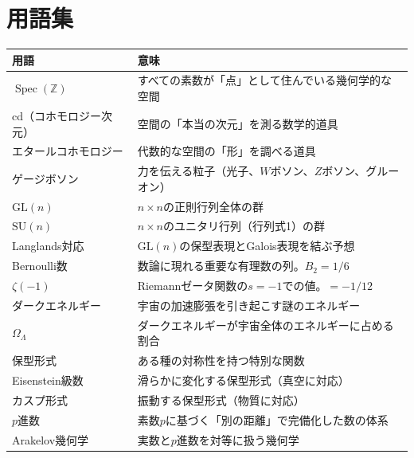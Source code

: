 \documentclass[12pt,a4paper]{article}
\newcommand{\Spec}{\operatorname{Spec}}
\begin{document}
\section*{用語集}

\begin{center}
\begin{tabular}{lp{10cm}}
\toprule
用語 & 意味 \\
\midrule
$\Spec(\mathbb{Z})$ & すべての素数が「点」として住んでいる幾何学的な空間 \\
cd（コホモロジー次元） & 空間の「本当の次元」を測る数学的道具 \\
エタールコホモロジー & 代数的な空間の「形」を調べる道具 \\
ゲージボソン & 力を伝える粒子（光子、$W$ボソン、$Z$ボソン、グルーオン） \\
$\mathrm{GL}(n)$ & $n\times n$の正則行列全体の群 \\
$\mathrm{SU}(n)$ & $n\times n$のユニタリ行列（行列式1）の群 \\
Langlands対応 & $\mathrm{GL}(n)$の保型表現とGalois表現を結ぶ予想 \\
Bernoulli数 & 数論に現れる重要な有理数の列。$B_2 = 1/6$ \\
$\zeta(-1)$ & Riemannゼータ関数の$s=-1$での値。$= -1/12$ \\
ダークエネルギー & 宇宙の加速膨張を引き起こす謎のエネルギー \\
$\Omega_\Lambda$ & ダークエネルギーが宇宙全体のエネルギーに占める割合 \\
保型形式 & ある種の対称性を持つ特別な関数 \\
Eisenstein級数 & 滑らかに変化する保型形式（真空に対応） \\
カスプ形式 & 振動する保型形式（物質に対応） \\
$p$進数 & 素数$p$に基づく「別の距離」で完備化した数の体系 \\
Arakelov幾何学 & 実数と$p$進数を対等に扱う幾何学 \\
\bottomrule
\end{tabular}
\end{center}
\end{document}
